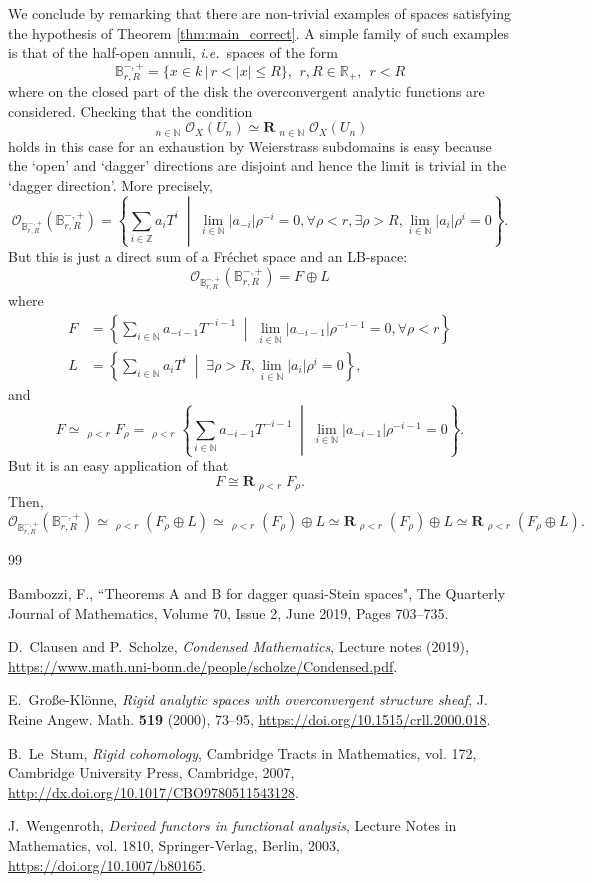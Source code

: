 \documentclass[11pt,leqno,a4paper]{amsart}
\theoremstyle{remark}
\theoremstyle{definition}
\numberwithin{equation}{theorem}
\def\B{{\mathbb B}}
\def\N{{\mathbb N}}
\def\R{{\mathbb R}}
\def\Z{{\mathbb Z}}
\def\l{\left}
\def\r{\right}
\def\ie{\emph{i.e.}~}
\def\cO{{\mathcal O}}
\def\limpro{\mathop{\lim\limits_{\displaystyle\leftarrow}}}
\begin{document}
We conclude by remarking that there are non-trivial examples of spaces satisfying the hypothesis of Theorem \ref{thm:main_correct}. A simple family of such examples is that of the half-open annuli, \ie spaces of the form
\[ \B_{r, R}^{-, +} = \{ x \in k \,|\,  r < |x| \le R  \}, \ \, r, R \in \R_+, \ \ r < R  \] 
where on the closed part of the disk the overconvergent analytic functions are considered. Checking that the condition 
\[ \limpro_{n \in \N} \cO_X(U_n) \simeq \mathbf{R}\! \limpro_{n \in \N} \cO_X(U_n) \]
holds in this case for an exhaustion by Weierstrass subdomains is easy because the `open' and `dagger' directions are disjoint and hence the limit is trivial in the `dagger direction'. More precisely,
\[ \cO_{\B_{r, R}^{-, +}}(\B_{r, R}^{-, +}) = \l \{\left. \sum_{i \in \Z} a_i T^i\;\; \right\vert\;\; \lim_{i \in \N} |a_{-i}| \rho^{-i} = 0, \forall \rho < r,  \exists \rho > R, \lim_{i \in \N} |a_i| \rho^{i} = 0 \r \}. \]
But this is just a direct sum of a Fr\'echet space and an LB-space:
\[ \cO_{\B_{r, R}^{-, +}}(\B_{r, R}^{-, +}) = F \oplus L \]
where 
\begin{align*} F &= \l \{\left. \sum_{i \in \N} a_{-i - 1} T^{-i - 1}\;\; \right\vert \;\;\lim_{i \in \N} |a_{-i -1}| \rho^{-i-1} = 0, \forall \rho < r  \r \}\\ L &= \l \{\left. \sum_{i \in \N} a_i T^i \;\;\right\vert\;\; \exists \rho > R, \lim_{i \in \N} |a_i| \rho^{i} = 0 \r \}, \end{align*}
and
\[ F \simeq \limpro_{\rho < r} F_\rho = \limpro_{\rho < r} \l \{\left. \sum_{i \in \N} a_{-i - 1} T^{-i - 1} \;\;\right\vert \;\; \lim_{i \in \N} |a_{-i -1}| \rho^{-i-1} = 0 \r \}. \]
But it is an easy application of \cite[Lemma 3.23]{Bam} that
\[ F \cong \mathbf{R}\!\limpro_{\rho < r} F_\rho.  \]
Then,
\[ \cO_{\B_{r, R}^{-, +}}(\B_{r, R}^{-, +}) \simeq \limpro_{\rho < r} (F_\rho \oplus L) \simeq  \limpro_{\rho < r} (F_\rho) \oplus L \simeq  \mathbf{R}\! \limpro_{\rho < r} (F_\rho) \oplus L \simeq  \mathbf{R}\! \limpro_{\rho < r} (F_\rho \oplus L). \]

\begin{thebibliography}{99}

 Bambozzi, F., ``Theorems A and B for dagger quasi-Stein spaces", The Quarterly Journal of Mathematics, Volume 70, Issue 2, June 2019, Pages 703–735.

D.~Clausen and P.~Scholze, \emph{Condensed {M}athematics}, Lecture notes
  (2019), \url{https://www.math.uni-bonn.de/people/scholze/Condensed.pdf}.

E.~Gro{\ss}e-Kl{\"o}nne, \emph{Rigid analytic spaces with overconvergent
  structure sheaf}, J. Reine Angew. Math. \textbf{519} (2000), 73--95,
  \url{https://doi.org/10.1515/crll.2000.018}.

B.~Le~Stum, \emph{Rigid cohomology}, Cambridge Tracts in Mathematics, vol. 172,
  Cambridge University Press, Cambridge, 2007,
  \url{http://dx.doi.org/10.1017/CBO9780511543128}.

J.~Wengenroth, \emph{Derived functors in functional analysis}, Lecture Notes in
  Mathematics, vol. 1810, Springer-Verlag, Berlin, 2003,
  \url{https://doi.org/10.1007/b80165}.

\end{thebibliography}
\end{document}
